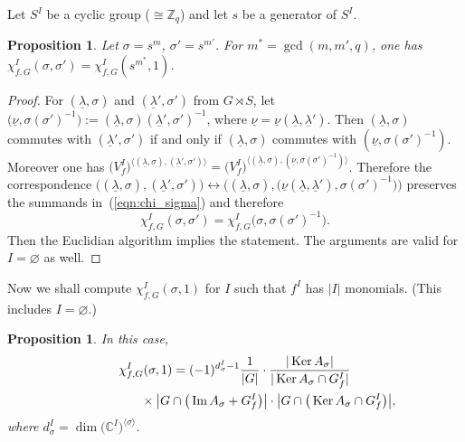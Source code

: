 \documentclass[11pt]{article}
\numberwithin{equation}{section}
\numberwithin{equation}{section}
\newtheorem{Proposition}[Theorem]{Proposition}
 { \theoremstyle{definition}
\newtheorem{Definition}[Theorem]{Definition}
\newtheorem{Remark}[Theorem]{Remark} }
\begin{document}
Let $S^I$ be a cyclic group ($\cong {\mathbb Z}_q$) and let $s$ be a generator of $S^I$.

\begin{Proposition} \label{prop:red}
 Let $\sigma=s^m$, $\sigma'=s^{m'}$. For $m^*=\gcd(m, m', q)$, one has
 $\chi_{f,G}^I(\sigma, \sigma')=\chi_{f,G}^I(s^{m^*}, 1)$.
\end{Proposition}

\begin{proof}
 For $(\underline{\lambda},\sigma)$ and $(\underline{\lambda}',\sigma')$ from $G \rtimes S$, let
 $\big(\underline{\nu},\sigma(\sigma')^{-1}\big):=(\underline{\lambda},\sigma)(\underline{\lambda}',\sigma')^{-1}$,
 where $\underline{\nu}=\underline{\nu}(\underline{\lambda},\underline{\lambda}')$. Then
 $(\underline{\lambda},\sigma)$ commutes with $(\underline{\lambda}',\sigma')$ if and only if
 $(\underline{\lambda},\sigma)$ commutes with $(\underline{\nu},\sigma(\sigma')^{-1})$.
 Moreover one has
 $\big(V_f^I\big)^{\langle(\underline{\lambda},\sigma),(\underline{\lambda}',\sigma')\rangle}=
 \big(V_f^I\big)^{\langle(\underline{\lambda},\sigma),(\underline{\nu},\sigma(\sigma')^{-1})\rangle}$.
 Therefore the correspondence
 $\big((\underline{\lambda},\sigma),(\underline{\lambda}',\sigma')\big)\longleftrightarrow
 \big((\underline{\lambda},\sigma),
 \big(\underline{\nu}(\underline{\lambda},\underline{\lambda}'),\sigma(\sigma')^{-1}\big)\big)
 $
 preserves the summands in~(\ref{eqn:chi_sigma}) and therefore
 \[
 \chi_{f,G}^I(\sigma,\sigma')=\chi_{f,G}^I\big(\sigma,\sigma(\sigma')^{-1}\big).
 \]
Then the Euclidian algorithm implies the statement. The arguments are valid for $I=\varnothing$ as well.
\end{proof}

Now we shall compute $\chi_{f,G}^I(\sigma, 1)$ for $I$ such that $f^I$ has $\vert I\vert$ monomials.
(This includes $I=\varnothing$.)

\begin{Proposition} \label{prop:chisigma1}
 In this case,
 \begin{gather}
 \chi_{f,G}^I(\sigma, 1)= (-1)^{d^I_\sigma-1}\frac{1}{\vert G\vert}\cdot
 \frac{\vert \operatorname{Ker}A_{\sigma}\vert}{\vert \operatorname{Ker}A_{\sigma}\cap G^I_f\vert}\nonumber\\
 \hphantom{\chi_{f,G}^I(\sigma, 1)=}{}\times \big\vert G\cap\big(\operatorname{Im}A_{\sigma}+G_f^I\big)\big\vert\cdot\big\vert G\cap\big(\operatorname{Ker}A_{\sigma}\cap G_f^I\big)\big\vert,\label{eqn:chisigma1}
 \end{gather}
 where $d^I_\sigma= \dim\big({\mathbb C}^I\big)^{\langle \sigma \rangle}$.
\end{Proposition}
\end{document}
